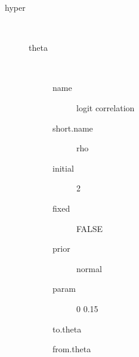 \begin{description}
	\item[hyper]\ 
	 \begin{description}
	 	\item[theta]\ 
	 	 \begin{description}
	 	 	 \item[ name ] logit correlation 
	 	 	 \item[ short.name ] rho 
	 	 	 \item[ initial ] 2 
	 	 	 \item[ fixed ] FALSE 
	 	 	 \item[ prior ] normal 
	 	 	 \item[ param ] 0 0.15 
	 	 	 \item[ to.theta ] \verb|| 
	 	 	 \item[ from.theta ] \verb|| 
	 	 \end{description}
	 \end{description}
\end{description}
